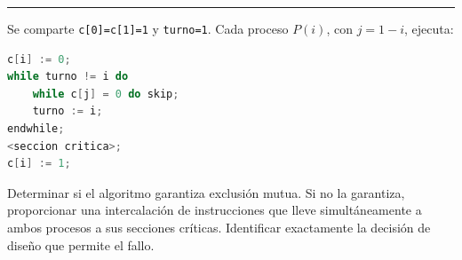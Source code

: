 \documentclass[11pt,a4paper,twoside,openright]{report}
\begin{document}
\vspace{15pt}
\hrule
\vspace{15pt}

\begin{ejercicio}
Se comparte \texttt{c[0]=c[1]=1} y \texttt{turno=1}. Cada proceso $P(i)$, con $j=1-i$, ejecuta:
\begin{lstlisting}[language=C++]
c[i] := 0;
while turno != i do
    while c[j] = 0 do skip;
    turno := i;
endwhile;
<seccion critica>;
c[i] := 1;
\end{lstlisting}
Determinar si el algoritmo garantiza exclusión mutua. Si no la garantiza, proporcionar una intercalación de instrucciones que lleve simultáneamente a ambos procesos a sus secciones críticas. Identificar exactamente la decisión de diseño que permite el fallo.
\end{ejercicio}
\end{document}
